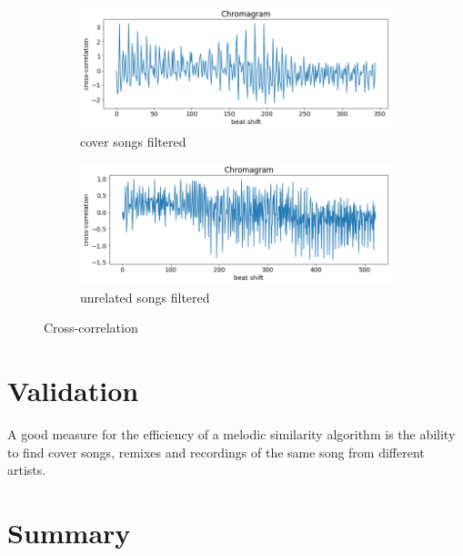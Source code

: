 \begin{figure}[htbp]
{{			\begin{subfigure}{.495\textwidth}
				\centering    
				\includegraphics[scale=0.3]{Images/Chroma/beatalignedchroma_corr_mean_filt.png}
				\caption{cover songs filtered}
				\label{ccf3}
			\end{subfigure}		
			\begin{subfigure}{.495\textwidth}
				\centering     
				\includegraphics[scale=0.3]{Images/Chroma/beatalignedchroma_corr_mean2_filt.png}
				\caption{unrelated songs filtered}
				\label{ccf4}
			\end{subfigure}%
	}}
	\caption{Cross-correlation}
	\label{fig:crosscorr2}
\end{figure}
\FloatBarrier


\section{Validation}
A good measure for the efficiency of a melodic similarity algorithm is the ability to find cover songs, remixes and recordings of the same song from different artists. 

\section{Summary}

